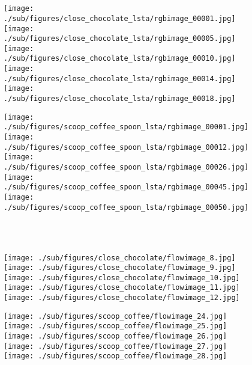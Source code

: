 \documentclass[10pt,twocolumn,letterpaper]{article}
\begin{document}
\begin{figure*}[t]
\begin{subfigure}[b]{0.4\textwidth}
		\end{subfigure}\\ 
	\	
        \begin{subfigure}[b]{0.4\textwidth}
			\texttt{[image: ./sub/figures/close\_chocolate\_lsta/rgbimage\_00001.jpg]}
			\texttt{[image: ./sub/figures/close\_chocolate\_lsta/rgbimage\_00005.jpg]}
			\texttt{[image: ./sub/figures/close\_chocolate\_lsta/rgbimage\_00010.jpg]}
			\texttt{[image: ./sub/figures/close\_chocolate\_lsta/rgbimage\_00014.jpg]}
			\texttt{[image: ./sub/figures/close\_chocolate\_lsta/rgbimage\_00018.jpg]}
			\end{subfigure} \hskip 5mm
	        \begin{subfigure}[b]{0.4\textwidth}
			\texttt{[image: ./sub/figures/scoop\_coffee\_spoon\_lsta/rgbimage\_00001.jpg]}
			\texttt{[image: ./sub/figures/scoop\_coffee\_spoon\_lsta/rgbimage\_00012.jpg]}
			\texttt{[image: ./sub/figures/scoop\_coffee\_spoon\_lsta/rgbimage\_00026.jpg]}
			\texttt{[image: ./sub/figures/scoop\_coffee\_spoon\_lsta/rgbimage\_00045.jpg]}
			\texttt{[image: ./sub/figures/scoop\_coffee\_spoon\_lsta/rgbimage\_00050.jpg]}
		\end{subfigure}\\
	\	
       \begin{subfigure}[b]{0.4\textwidth}
		    \texttt{[image: ./sub/figures/close\_chocolate/flowimage\_8.jpg]}
			\texttt{[image: ./sub/figures/close\_chocolate/flowimage\_9.jpg]}
			 \texttt{[image: ./sub/figures/close\_chocolate/flowimage\_10.jpg]}
			\texttt{[image: ./sub/figures/close\_chocolate/flowimage\_11.jpg]}
			\texttt{[image: ./sub/figures/close\_chocolate/flowimage\_12.jpg]}
			\end{subfigure} \hskip 5mm
	        \begin{subfigure}[b]{0.4\textwidth}
			\texttt{[image: ./sub/figures/scoop\_coffee/flowimage\_24.jpg]}
			\texttt{[image: ./sub/figures/scoop\_coffee/flowimage\_25.jpg]}
			\texttt{[image: ./sub/figures/scoop\_coffee/flowimage\_26.jpg]}
			\texttt{[image: ./sub/figures/scoop\_coffee/flowimage\_27.jpg]}
			\texttt{[image: ./sub/figures/scoop\_coffee/flowimage\_28.jpg]}
		\end{subfigure}\\
	\	

\end{figure*}
\end{document}
